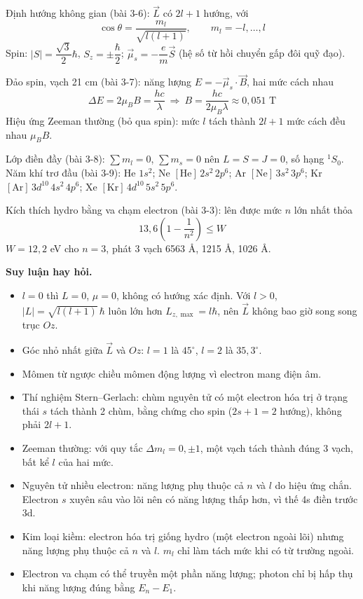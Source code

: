 \documentclass[11pt,a4paper]{article}
\begin{document}
Định hướng không gian (bài 3-6): $\vec L$ có $2l+1$ hướng, với
\begin{equation*}
    \cos\theta=\frac{m_l}{\sqrt{l(l+1)}},\qquad m_l=-l,\dots,l
\end{equation*}
Spin: $|S|=\dfrac{\sqrt3}{2}\hbar$, $S_z=\pm\dfrac\hbar2$; $\vec\mu_s=-\dfrac{e}{m}\vec S$ (hệ số từ hồi chuyển gấp đôi quỹ đạo).

Đảo spin, vạch 21 cm (bài 3-7): năng lượng $E=-\vec\mu_s\cdot\vec B$, hai mức cách nhau
\begin{equation*}
    \Delta E=2\mu_BB=\frac{hc}{\lambda}\ \Longrightarrow\ B=\frac{hc}{2\mu_B\lambda}\approx0{,}051\text{ T}
\end{equation*}
Hiệu ứng Zeeman thường (bỏ qua spin): mức $l$ tách thành $2l+1$ mức cách đều nhau $\mu_BB$.

Lớp điền đầy (bài 3-8): $\sum m_l=0$, $\sum m_s=0$ nên $L=S=J=0$, số hạng ${}^1S_0$. Năm khí trơ đầu (bài 3-9): He $1s^2$; Ne $[\mathrm{He}]\,2s^2\,2p^6$; Ar $[\mathrm{Ne}]\,3s^2\,3p^6$; Kr $[\mathrm{Ar}]\,3d^{10}\,4s^2\,4p^6$; Xe $[\mathrm{Kr}]\,4d^{10}\,5s^2\,5p^6$.

Kích thích hydro bằng va chạm electron (bài 3-3): lên được mức $n$ lớn nhất thỏa
\begin{equation*}
    13{,}6\left(1-\frac1{n^2}\right)\le W
\end{equation*}
$W=12{,}2$ eV cho $n=3$, phát 3 vạch 6563 Å, 1215 Å, 1026 Å.

\textbf{Suy luận hay hỏi.}
\begin{itemize}
    \item $l=0$ thì $L=0$, $\mu=0$, không có hướng xác định. Với $l>0$, $|L|=\sqrt{l(l+1)}\,\hbar$ luôn lớn hơn $L_{z,\max}=l\hbar$, nên $\vec L$ không bao giờ song song trục $Oz$.
    \item Góc nhỏ nhất giữa $\vec L$ và $Oz$: $l=1$ là $45^\circ$, $l=2$ là $35{,}3^\circ$.
    \item Mômen từ ngược chiều mômen động lượng vì electron mang điện âm.
    \item Thí nghiệm Stern--Gerlach: chùm nguyên tử có một electron hóa trị ở trạng thái $s$ tách thành 2 chùm, bằng chứng cho spin ($2s+1=2$ hướng), không phải $2l+1$.
    \item Zeeman thường: với quy tắc $\Delta m_l=0,\pm1$, một vạch tách thành đúng 3 vạch, bất kể $l$ của hai mức.
    \item Nguyên tử nhiều electron: năng lượng phụ thuộc cả $n$ và $l$ do hiệu ứng chắn. Electron $s$ xuyên sâu vào lõi nên có năng lượng thấp hơn, vì thế 4s điền trước 3d.
    \item Kim loại kiềm: electron hóa trị giống hydro (một electron ngoài lõi) nhưng năng lượng phụ thuộc cả $n$ và $l$. $m_l$ chỉ làm tách mức khi có từ trường ngoài.
    \item Electron va chạm có thể truyền một phần năng lượng; photon chỉ bị hấp thụ khi năng lượng đúng bằng $E_n-E_1$.
\end{itemize}
\end{document}
